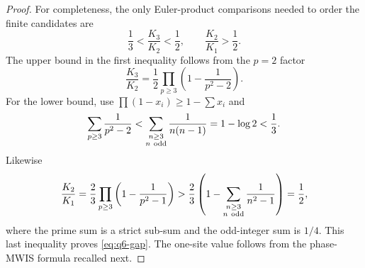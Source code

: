 \documentclass[11pt]{article}
\theoremstyle{definition}
\theoremstyle{remark}
\begin{document}
\begin{proof}
For completeness, the only Euler-product comparisons needed to order the
finite candidates are
\begin{equation}
 \frac13<\frac{K_3}{K_2}<\frac12,\qquad
 \frac{K_2}{K_1}>\frac12.
 \label{eq:ratios}
\end{equation}
The upper bound in the first inequality follows from the \(p=2\) factor
\[
 \frac{K_3}{K_2}
 =\frac12\prod_{p\geq3}\left(1-\frac1{p^2-2}\right).
\]
For the lower bound, use
\(\prod(1-x_i)\geq1-\sum x_i\) and
\[
 \sum_{p\geq3}\frac1{p^2-2}
 <\sum_{\substack{n\geq3\\n\ {\rm odd}}}\frac1{n(n-1)}
 =1-\log2<\frac13.
\]
Likewise
\[
 \frac{K_2}{K_1}
 =\frac23\prod_{p\geq3}\left(1-\frac1{p^2-1}\right)
 >\frac23\left(1-\sum_{\substack{n\geq3\\n\ {\rm odd}}}
 \frac1{n^2-1}\right)=\frac12,
\]
where the prime sum is a strict sub-sum and the odd-integer sum is \(1/4\).
This last inequality proves \eqref{eq:q6-gap}.  The one-site value follows
from the phase-MWIS formula recalled next.
\end{proof}

\DeferredSquareSection
\DeferredFinalSection
\end{document}
